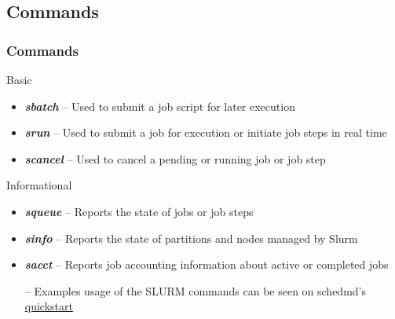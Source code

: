 \subsection{Commands}
\begin{frame}
\frametitle{Commands}
  \begin{block}{Basic}
    \begin{itemize}
    \item \emph{\textbf{sbatch}} -- Used to submit a job script for later execution
    \item \emph{\textbf{srun}} --  Used to submit a job for execution or initiate job steps in real time
    \item \emph{\textbf{scancel}} -- Used to cancel a pending or running job or job step
    \end{itemize}
  \end{block}
  \begin{block}{Informational}
    \begin{itemize}
    \item \emph{\textbf{squeue}} -- Reports the state of jobs or job steps
    \item \emph{\textbf{sinfo}} -- Reports the state of partitions and nodes managed by Slurm
    \item \emph{\textbf{sacct}} -- Reports job accounting information about active or completed jobs
    \end{itemize}
  \end{block}
  
  \begin{itemize}\footnotesize
  \item[--] Examples usage of the SLURM commands can be seen on schedmd's \href{http://slurm.schedmd.com/quickstart.html}{quickstart}
  \end{itemize}
\end{frame}


